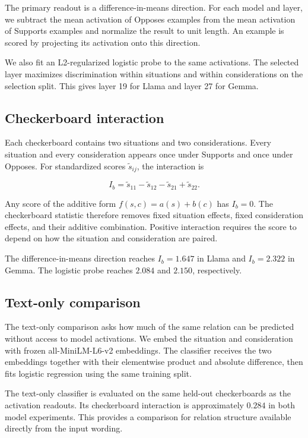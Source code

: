 \documentclass{article}
\begin{document}
The primary readout is a difference-in-means direction. For each model and
layer, we subtract the mean activation of Opposes examples from the mean
activation of Supports examples and normalize the result to unit length.
An example is scored by projecting its activation onto this direction.

We also fit an L2-regularized logistic probe to the same activations. The
selected layer maximizes discrimination within situations and within
considerations on the selection split. This gives layer 19 for Llama and
layer 27 for Gemma.

\subsection{Checkerboard interaction}

Each checkerboard contains two situations and two considerations. Every
situation and every consideration appears once under Supports and once under
Opposes. For standardized scores $\tilde{s}_{ij}$, the interaction is

\[
I_b
=
\tilde{s}_{11}
-
\tilde{s}_{12}
-
\tilde{s}_{21}
+
\tilde{s}_{22}.
\]

Any score of the additive form
$f(s,c)=a(s)+b(c)$ has $I_b=0$. The checkerboard statistic therefore removes
fixed situation effects, fixed consideration effects, and their additive
combination. Positive interaction requires the score to depend on how the
situation and consideration are paired.

The difference-in-means direction reaches $I_b=1.647$ in Llama and
$I_b=2.322$ in Gemma. The logistic probe reaches $2.084$ and $2.150$,
respectively.

\subsection{Text-only comparison}

The text-only comparison asks how much of the same relation can be predicted
without access to model activations. We embed the situation and consideration
with frozen all-MiniLM-L6-v2 embeddings. The classifier receives the two
embeddings together with their elementwise product and absolute difference,
then fits logistic regression using the same training split.

The text-only classifier is evaluated on the same held-out checkerboards as
the activation readouts. Its checkerboard interaction is approximately
$0.284$ in both model experiments. This provides a comparison for relation
structure available directly from the input wording.
\end{document}

